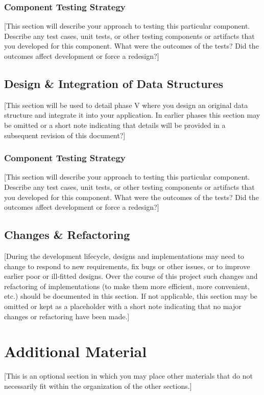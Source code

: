 \documentclass[12pt]{scrartcl} %
\begin{document}
\subsubsection{Component Testing Strategy}

[This section will describe your approach to testing this particular component.  Describe any test cases, unit tests, or other testing components or artifacts that you developed for this component.  What were the outcomes of the tests?  Did the outcomes affect development or force a redesign?]

\subsection{Design \& Integration of Data Structures}

[This section will be used to detail phase V where you design an original data structure and integrate it into your application.  In earlier phases this section may be omitted or a short note indicating that details will be provided in a subsequent revision of this document?]

\subsubsection{Component Testing Strategy}

[This section will describe your approach to testing this particular component.  Describe any test cases, unit tests, or other testing components or artifacts that you developed for this component.  What were the outcomes of the tests?  Did the outcomes affect development or force a redesign?]

\subsection{Changes \& Refactoring}

[During the development lifecycle, designs and implementations may need to change to respond to new   requirements, fix bugs or other issues, or to improve earlier poor or ill-fitted designs.  Over the course of this project such changes and refactoring of implementations (to make them more efficient, more convenient, etc.) should be documented in this section.  If not applicable, this section may be omitted or kept as a placeholder with a short note indicating that no major changes or refactoring have been made.]

\section{Additional Material}

[This is an optional section in which you may place other materials that do not necessarily fit within the organization of the other sections.]

\nocite{*}

%

\end{document}

